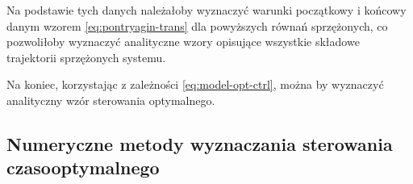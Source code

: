 Na podstawie tych danych należałoby wyznaczyć warunki początkowy i końcowy danym wzorem \ref{eq:pontryagin-trans} dla powyższych równań sprzężonych, co pozwoliłoby wyznaczyć analityczne wzory opisujące wszystkie składowe trajektorii sprzężonych systemu.

Na koniec, korzystając z zależności \ref{eq:model-opt-ctrl}, można by wyznaczyć analityczny wzór sterowania optymalnego.


\subsection{Numeryczne metody wyznaczania sterowania czasooptymalnego}
\label{sub:toc-num}

